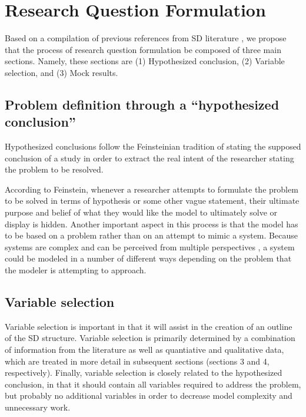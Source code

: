 \documentclass[11pt]{article}
\begin{document}
\section{Research Question Formulation}

Based on a compilation of previous references from SD literature \cite {PenaLyneis2009}, we propose that the process of research question formulation be composed of three main sections.  Namely, these sections are (1) Hypothesized conclusion, (2) Variable selection, and (3) Mock results.  

\subsection{Problem definition through a ``hypothesized conclusion''}

Hypothesized conclusions follow the Feinsteinian tradition \cite{Feinstein1987} of stating the supposed conclusion of a study in order to extract the real intent of the researcher stating the problem to be resolved.

According to Feinstein, whenever a researcher attempts to formulate the problem to be solved in terms of hypothesis or some other vague statement, their ultimate purpose and belief of what they would like the model to ultimately solve or display is hidden.  Another important aspect in this process is that the model has to be based on a problem rather than on an attempt to mimic a system.  Because systems are complex and can be perceived from multiple perspectives \cite{GIERE2006}, a system could be modeled in a number of different ways depending on the problem that the modeler is attempting to approach.  

\subsection{Variable selection}

Variable selection is important in that it will assist in the creation of an outline of the SD structure. Variable selection is primarily determined by a combination of information from the literature as well as quantiative and qualitative data, which are treated in more detail in subsequent sections (sections 3 and 4, respectively).  Finally, variable selection is closely related to the hypothesized conclusion, in that it should contain all variables required to address the problem, but probably no additional variables in order to decrease model complexity and unnecessary work.
\end{document}
